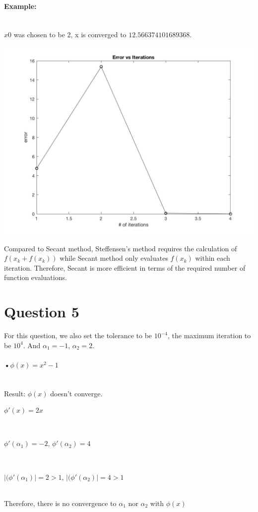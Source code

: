 \documentclass[11pt]{article} %
\begin{document}
\paragraph{Example:}\mbox{}\\
$x0$ was chosen to be 2, x is converged to $12.566374101689368$.
\begin{center}
\includegraphics[scale = 0.35]{q4.jpg}\\\medskip
\end{center}
Compared to Secant method, Steffensen’s method requires the calculation of $f(x_{k}+f(x_{k}))$ while Secant method only evaluates $f(x_{k})$ within each iteration. Therefore, Secant is more efficient in terms of the required number of function evaluations.
 

\section{Question 5}
For this question, we also set the tolerance to be $10^{-4}$, the maximum iteration to be $10^{4}$. And $\alpha_{1} = -1$, $\alpha_{2} = 2$.
\paragraph{•$\phi(x) = x^{2}-1$}\mbox{}\\
Result: $\phi(x)$ doesn't converge.\\
\centerline{$\phi'(x) = 2x$}\\\linebreak
\centerline{$\phi'(\alpha_{1}) = -2$, $\phi'(\alpha_{2}) =4$}\\\linebreak
\centerline{$\mid(\phi'(\alpha_{1})\mid = 2>1$, $\mid(\phi'(\alpha_{2})\mid = 4>1$}\\\linebreak
Therefore, there is no convergence to $\alpha_{1}$ nor $\alpha_{2}$ with $\phi(x)$
\end{document}
